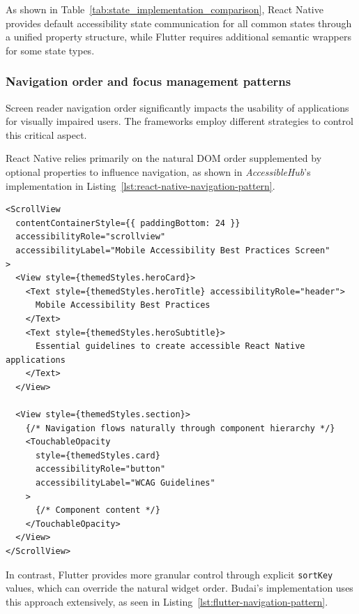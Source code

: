 \pagebreak

As shown in Table~\ref{tab:state_implementation_comparison}, React Native provides default accessibility state communication for all common states through a unified property structure, while Flutter requires additional semantic wrappers for some state types.

\subsubsection{Navigation order and focus management patterns}

Screen reader navigation order significantly impacts the usability of applications for visually impaired users. The frameworks employ different strategies to control this critical aspect.

React Native relies primarily on the natural DOM order supplemented by optional properties to influence navigation, as shown in \textit{AccessibleHub}'s implementation in Listing~\ref{lst:react-native-navigation-pattern}.

\begin{lstlisting}[style=ReactNativeStyle, caption=Navigation order in React Native, label=lst:react-native-navigation-pattern]
<ScrollView
  contentContainerStyle={{ paddingBottom: 24 }}
  accessibilityRole="scrollview"
  accessibilityLabel="Mobile Accessibility Best Practices Screen"
>
  <View style={themedStyles.heroCard}>
    <Text style={themedStyles.heroTitle} accessibilityRole="header">
      Mobile Accessibility Best Practices
    </Text>
    <Text style={themedStyles.heroSubtitle}>
      Essential guidelines to create accessible React Native applications
    </Text>
  </View>
  
  <View style={themedStyles.section}>
    {/* Navigation flows naturally through component hierarchy */}
    <TouchableOpacity 
      style={themedStyles.card}
      accessibilityRole="button" 
      accessibilityLabel="WCAG Guidelines"
    >
      {/* Component content */}
    </TouchableOpacity>
  </View>
</ScrollView>
\end{lstlisting}

\pagebreak

In contrast, Flutter provides more granular control through explicit \texttt{sortKey} values, which can override the natural widget order. Budai's implementation uses this approach extensively, as seen in Listing~\ref{lst:flutter-navigation-pattern}.

